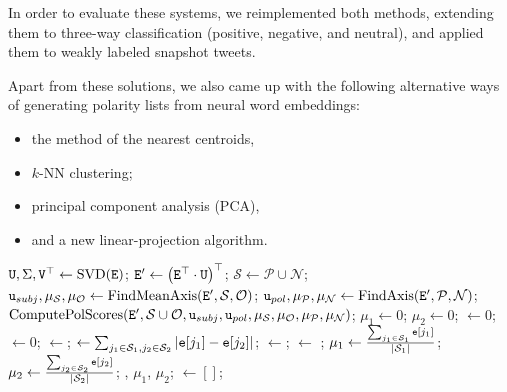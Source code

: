In order to evaluate these systems, we reimplemented both methods,
extending them to three-way classification (positive, negative, and
neutral), and applied them to weakly labeled snapshot tweets.

Apart from these solutions, we also came up with the following
alternative ways of generating polarity lists from neural word
embeddings:
\begin{itemize}
\item the method of the nearest centroids,
\item $k$-NN clustering;
\item principal component analysis (PCA),
\item and a new linear-projection algorithm.
\end{itemize}

\begin{algorithm}
  \begin{algorithmic}[1]
    \Statex{}
    \Statex{}
    \State $\texttt{U}, \Sigma, \texttt{V}^\top\gets\textrm{SVD}(\texttt{E})$;
    \State $\texttt{E}'\gets\left(\texttt{E}^\top\cdot \texttt{U}\right)^\top$;
    \State $\mathcal{S}\gets\mathcal{P}\cup\mathcal{N}$;
    \State $\texttt{u}_{subj}, \mu_{\mathcal{S}}, \mu_{\mathcal{O}}\gets\textrm{FindMeanAxis}(\texttt{E}', \mathcal{S}, \mathcal{O})$;
    \State $\texttt{u}_{pol}, \mu_{\mathcal{P}}, \mu_{\mathcal{N}}\gets\textrm{FindAxis}(\texttt{E}', \mathcal{P}, \mathcal{N})$;
    \State\Return $\func{ComputePolScores}(\vars{E}', \mathcal{S}\cup\mathcal{O},%
    \vars{u}_{subj}, \vars{u}_{pol}, \mu_{\mathcal{S}}, \mu_{\mathcal{O}},%
    \mu_{\mathcal{P}}, \mu_{\mathcal{N}})$;
    \EndFunction
    \Statex
    \State $\mu_1\gets 0$; $\mu_2\gets 0$;  $\gets 0$;  $\gets 0$;
    \State {} $\gets$;
    \State {} $\gets\sum_{j_1\in\mathcal{S}_1,j_2\in\mathcal{S}_2}\left|\texttt{e}[j_1] - \texttt{e}[j_2]\right|$;
    \State {} $\gets$;  $\gets$ ;
    \State $\mu_1\gets\frac{\sum_{j_1\in\mathcal{S}_1}\texttt{e}[j_1]}{|\mathcal{S}_1|}$; $\mu_2\gets\frac{\sum_{j_2\in\mathcal{S}_2}\texttt{e}[j_2]}{|\mathcal{S}_2|}$;
    \EndIf
    \EndFor
    \State\Return{}, $\mu_1$, $\mu_2$;
    \EndFunction
    \Statex
    \State{} $\gets []$;


\end{algorithmic}
\end{algorithm}
